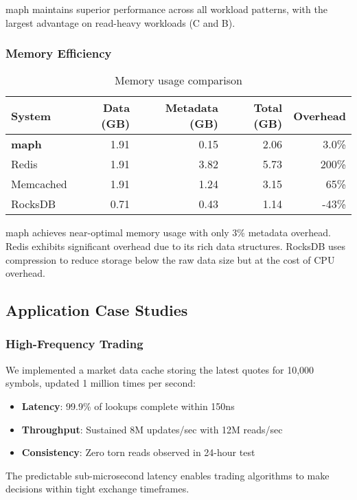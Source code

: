 \documentclass[11pt]{article}
\begin{document}
maph maintains superior performance across all workload patterns, with the largest advantage on read-heavy workloads (C and B).

\subsubsection{Memory Efficiency}

\begin{table}[htbp]
\centering
\caption{Memory usage comparison}
\label{tab:memory}
\begin{tabular}{lrrrr}
\toprule
System & Data (GB) & Metadata (GB) & Total (GB) & Overhead \\
\midrule
\textbf{maph} & 1.91 & 0.15 & 2.06 & 3.0\% \\
Redis & 1.91 & 3.82 & 5.73 & 200\% \\
Memcached & 1.91 & 1.24 & 3.15 & 65\% \\
RocksDB & 0.71 & 0.43 & 1.14 & -43\% \\
\bottomrule
\end{tabular}
\end{table}

maph achieves near-optimal memory usage with only 3\% metadata overhead. Redis exhibits significant overhead due to its rich data structures. RocksDB uses compression to reduce storage below the raw data size but at the cost of CPU overhead.

\subsection{Application Case Studies}

\subsubsection{High-Frequency Trading}
We implemented a market data cache storing the latest quotes for 10,000 symbols, updated 1 million times per second:

\begin{itemize}
\item \textbf{Latency}: 99.9\% of lookups complete within 150ns
\item \textbf{Throughput}: Sustained 8M updates/sec with 12M reads/sec
\item \textbf{Consistency}: Zero torn reads observed in 24-hour test
\end{itemize}

The predictable sub-microsecond latency enables trading algorithms to make decisions within tight exchange timeframes.
\end{document}
